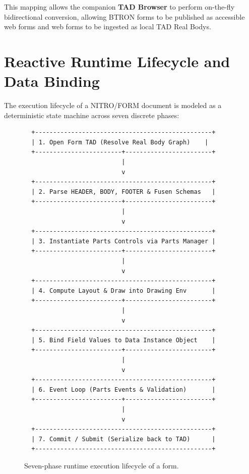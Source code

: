 \documentclass[10pt,journal,compsoc,twocolumn]{article}
\begin{document}
This mapping allows the companion \textbf{TAD Browser} to perform on-the-fly bidirectional conversion, allowing BTRON forms to be published as accessible web forms and web forms to be ingested as local TAD Real Bodys.

\section{Reactive Runtime Lifecycle and Data Binding}
\label{sec:lifecycle}

The execution lifecycle of a NITRO/FORM document is modeled as a deterministic state machine across seven discrete phases:

\begin{figure}[htbp]
\centering
\begin{lstlisting}
  +-------------------------------------------------+
  | 1. Open Form TAD (Resolve Real Body Graph)    |
  +------------------------+------------------------+
                           |
                           v
  +-------------------------------------------------+
  | 2. Parse HEADER, BODY, FOOTER & Fusen Schemas   |
  +------------------------+------------------------+
                           |
                           v
  +-------------------------------------------------+
  | 3. Instantiate Parts Controls via Parts Manager |
  +------------------------+------------------------+
                           |
                           v
  +-------------------------------------------------+
  | 4. Compute Layout & Draw into Drawing Env       |
  +------------------------+------------------------+
                           |
                           v
  +-------------------------------------------------+
  | 5. Bind Field Values to Data Instance Object    |
  +------------------------+------------------------+
                           |
                           v
  +-------------------------------------------------+
  | 6. Event Loop (Parts Events & Validation)       |
  +------------------------+------------------------+
                           |
                           v
  +-------------------------------------------------+
  | 7. Commit / Submit (Serialize back to TAD)      |
  +-------------------------------------------------+
\end{lstlisting}
\caption{Seven-phase runtime execution lifecycle of a form.}
\label{fig:lifecycle}
\end{figure}
\end{document}
